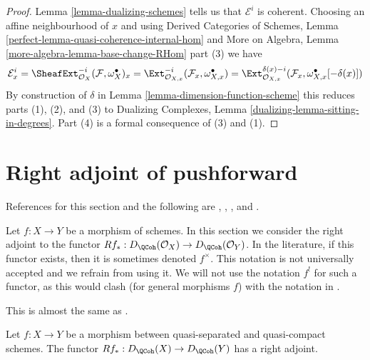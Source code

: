 \begin{proof}
Lemma \ref{lemma-dualizing-schemes} tells us that $\mathcal{E}^i$
is coherent. Choosing an affine neighbourhood of $x$ and using
Derived Categories of Schemes, Lemma
\ref{perfect-lemma-quasi-coherence-internal-hom}
and
More on Algebra, Lemma
\ref{more-algebra-lemma-base-change-RHom} part (3)
we have
$$
\mathcal{E}^i_x =
\SheafExt^{-i}_{\mathcal{O}_X}(\mathcal{F}, \omega_X^\bullet)_x =
\Ext^{-i}_{\mathcal{O}_{X, x}}(\mathcal{F}_x,
\omega_{X, x}^\bullet) =
\Ext^{\delta(x) - i}_{\mathcal{O}_{X, x}}(\mathcal{F}_x,
\omega_{X, x}^\bullet[-\delta(x)])
$$
By construction of $\delta$ in Lemma \ref{lemma-dimension-function-scheme}
this reduces parts (1), (2), and (3) to
Dualizing Complexes, Lemma \ref{dualizing-lemma-sitting-in-degrees}.
Part (4) is a formal consequence of (3) and (1).
\end{proof}




\section{Right adjoint of pushforward}
\label{section-twisted-inverse-image}

\noindent
References for this section and the following are
\cite{Neeman-Grothendieck}, \cite{LN},
\cite{Lipman-notes}, and \cite{Neeman-improvement}.

\medskip\noindent
Let $f : X \to Y$ be a morphism of schemes.
In this section we consider the right adjoint to the functor
$Rf_* : D_\QCoh(\mathcal{O}_X) \to D_\QCoh(\mathcal{O}_Y)$.
In the literature, if this functor exists, then it is sometimes
denoted $f^{\times}$. This notation is not universally accepted and we refrain
from using it. We will not use the notation $f^!$ for such a functor,
as this would clash (for general morphisms $f$) with the notation in
\cite{RD}.

\begin{lemma}
\label{lemma-twisted-inverse-image}
\begin{reference}
This is almost the same as \cite[Example 4.2]{Neeman-Grothendieck}.
\end{reference}
Let $f : X \to Y$ be a morphism between quasi-separated and quasi-compact
schemes. The functor $Rf_* : D_\QCoh(X) \to D_\QCoh(Y)$ has a
right adjoint.
\end{lemma}

